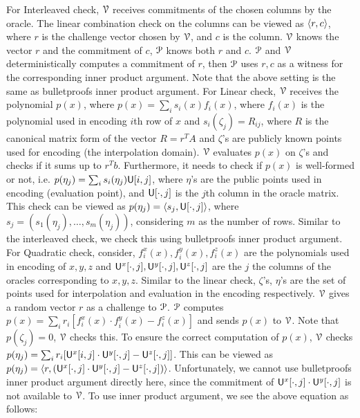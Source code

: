 For Interleaved check, $\mathcal{V}$ receives commitments of the chosen columns by the oracle. The linear combination check on the columns can be viewed as $\langle r,c\rangle$, where $r$ is the challenge vector chosen by $\mathcal{V}$, and $c$ is the column. $\mathcal{V}$ knows the vector $r$ and the commitment of $c$, $\mathcal{P}$ knows both $r$ and $c$. $\mathcal{P}$ and $\mathcal{V}$ deterministically computes a commitment of $r$, then $\mathcal{P}$ uses $r, c$ as a witness for the corresponding inner product argument. Note that the above setting is the same as bulletproofs inner product argument.
For Linear check, $\mathcal{V}$ receives the polynomial $p(x)$, where $p(x) = \sum_i s_i(x) f_i(x)$, where $f_i(x)$ is the polynomial used in encoding $i$th row of $x$ and $s_i(\zeta_j) = R_{ij}$, where $R$ is the canonical matrix form of the vector $R = r^TA$ and $\zeta$'s are publicly known points used for encoding (the interpolation domain). $\mathcal{V}$ evaluates $p(x)$ on $\zeta$'s and checks if it sums up to $r^Tb$. Furthermore, it needs to check if $p(x)$ is well-formed or not, i.e. $p(\eta_j) = \sum_i s_i(\eta_j) \mathsf{U}[i,j]$, where $\eta$'s are the public points used in encoding (evaluation point), and $\mathsf{U}[\cdot,j]$ is the $j$th column in the oracle matrix. This check can be viewed as $p(\eta_j) = \langle s_j,\mathsf{U}[\cdot,j]\rangle$, where $s_j = (s_1(\eta_j), \ldots, s_m(\eta_j))$, considering $m$ as the number of rows. Similar to the interleaved check, we check this using bulletproofs inner product argument.
For Quadratic check, consider, $f^x_i(x), f^y_i(x), f^z_i(x)$ are the polynomials used in encoding of $x, y, z$ and $\mathsf{U}^x[\cdot,j], \mathsf{U}^y[\cdot,j], \mathsf{U}^z[\cdot, j]$ are the $j$ the columns of the oracles corresponding to $x, y, z$. Similar to the linear check, $\zeta$'s, $\eta$'s are the set of points used for interpolation and evaluation in the encoding respectively.  $\mathcal{V}$ gives a random vector $r$ as a challenge to $\mathcal{P}$. $\mathcal{P}$ computes $p(x) = \sum_i r_i [ f^x_i (x) \cdot f^y_i(x) - f^z_i(x)]$ and sends $p(x)$ to $\mathcal{V}$. Note that $p(\zeta_j) = 0$, $\mathcal{V}$ checks this. To ensure the correct computation of $p(x)$, $\mathcal{V}$ checks $p(\eta_j) = \sum_i r_i [ \mathsf{U}^x[i,j] \cdot \mathsf{U}^y[\cdot,j] - \mathsf{U}^z[\cdot,j]]$. This can be viewed as $p(\eta_j) = \langle r,(\mathsf{U}^x[\cdot,j] \cdot \mathsf{U}^y[\cdot,j] - \mathsf{U}^z[\cdot,j])\rangle$. Unfortunately, we cannot use bulletproofs inner product argument directly here, since the commitment of $\mathsf{U}^x[\cdot,j] \cdot \mathsf{U}^y[\cdot,j]$ is not available to $\mathcal{V}$. To use inner product argument, we see the above equation as follows:
